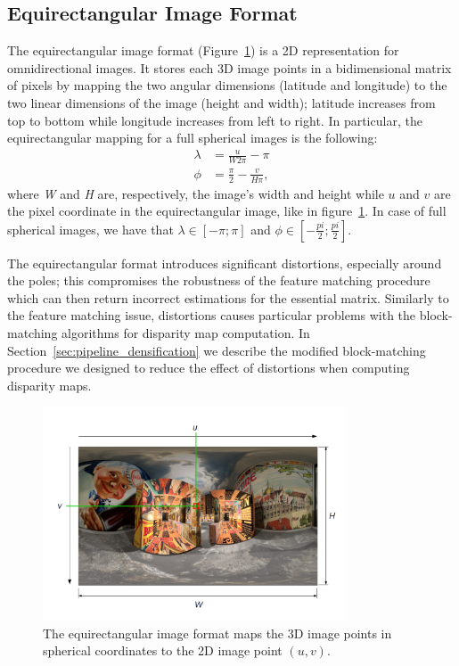 \subsection{Equirectangular Image Format}
\label{subsec:image_format}
The equirectangular image format (Figure~\ref{fig:equirectangular}) is a 2D
representation for omnidirectional 
images. It stores each 3D image points in a bidimensional matrix of pixels
by mapping the two angular dimensions (latitude and longitude) to the two
linear dimensions of the image (height and width); latitude increases from 
top to bottom while longitude increases from left to right.
In particular, the equirectangular mapping for a full spherical images is the
following:
\begin{subequations}
	\label{eq:ll2Cartesian_first}
	\begin{align}
	\lambda &= \frac{u}{W 2 \pi} - \pi \\
	\phi &= \frac{\pi}{2} - \frac{v}{H \pi}\text{,}
	\end{align}
\end{subequations}
\noindent where \textit{W} and \textit{H} are, respectively, 
the image's width and height while $u$ and $v$ are the pixel coordinate 
in the equirectangular image, like in figure~\ref{fig:equirectangular}.
In case of full spherical images, we have that
$ \lambda \in [-\pi; \pi] $ and $\phi \in [-\frac{pi}{2}; \frac{pi}{2}] $.

The equirectangular format introduces significant distortions, especially 
around the poles; this compromises the robustness of the feature matching 
procedure which can then return incorrect estimations for the essential 
matrix.
Similarly to the feature matching issue, distortions causes particular problems
with the block-matching algorithms for disparity map computation.
In Section~\ref{sec:pipeline_densification} we describe the modified 
block-matching procedure we designed to reduce the effect of distortions 
when computing disparity maps.
\begin{figure}[h]
	\centering
	\includegraphics[width=0.8\textwidth]{img/equirectangular}
	\caption{The equirectangular image format maps the 3D image points in 
	spherical coordinates to the 2D image point $(u, v)$.}
	\label{fig:equirectangular}
\end{figure}

